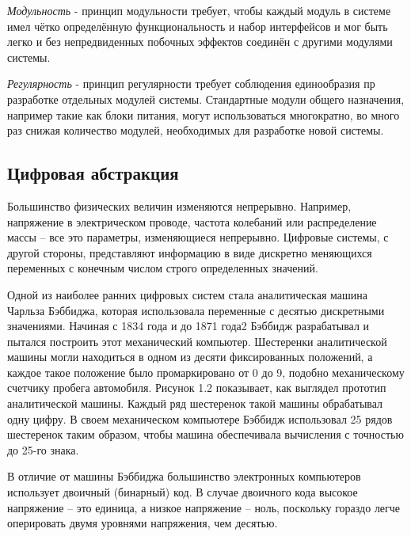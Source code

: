     \par \textit{Модульность} - принцип модульности требует, чтобы каждый модуль в системе имел чётко определённую функциональность и набор интерфейсов и мог быть легко и без непредвиденных побочных эффектов соединён с другими модулями системы.
    
    \par \textit{Регулярность} - принцип регулярности требует соблюдения единообразия пр разработке отдельных модулей системы. Стандартные модули общего назначения, например такие как блоки питания, могут использоваться многократно, во много раз снижая количество модулей, необходимых для разработке новой системы.
    
    \subsection{Цифровая абстракция}
    
    \par Большинство физических величин изменяются непрерывно. Например, напряжение в электрическом проводе, частота колебаний или распределение массы – все это параметры, изменяющиеся непрерывно. Цифровые системы, с другой стороны, представляют информацию в виде дискретно меняющихся переменных с конечным числом строго определенных значений. 
    
    \par Одной из наиболее ранних цифровых систем стала аналитическая машина Чарльза Бэббиджа, которая использовала переменные с десятью дискретными значениями. Начиная с 1834 года и до 1871 года2 Бэббидж разрабатывал и пытался построить этот механический компьютер. Шестеренки аналитической машины могли находиться в одном из десяти фиксированных положений, а каждое такое положение было промаркировано от 0 до 9, подобно механическому счетчику пробега автомобиля. Рисунок 1.2 показывает, как выглядел прототип аналитической машины. Каждый ряд шестеренок такой машины обрабатывал одну цифру. В своем механическом компьютере Бэббидж использовал 25 рядов шестеренок таким образом, чтобы машина обеспечивала вычисления с точностью до 25-го знака.
    
    \par В отличие от машины Бэббиджа большинство электронных компьютеров использует двоичный (бинарный) код. В случае двоичного кода высокое напряжение – это единица, а низкое напряжение – ноль, поскольку гораздо легче оперировать двумя уровнями напряжения, чем десятью.
    
